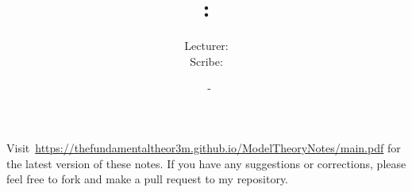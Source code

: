 \documentclass[a4paper, 12pt, openany, oneside]{book}
\title{\vspace{-2em}\COURSENUMBER: \COURSENAME}
\author{Lecturer: \LECTURER \\ Scribe: \SCRIBE}
\date{\UNIVERSITY\ - \TERM}
\begin{document}
\setlength{\abovedisplayskip}{7.5pt}  %
\setlength{\belowdisplayskip}{7.5pt}  %
\setlength{\abovedisplayshortskip}{2pt}
\setlength{\belowdisplayshortskip}{2pt}

\maketitle
\thispagestyle{empty}

\tableofcontents
\thispagestyle{empty}

\newpage

\nocite{*}




% 

\newpage




\printbibliography[prenote=mybibnote]
\thispagestyle{empty}

Visit~\url{https://thefundamentaltheor3m.github.io/ModelTheoryNotes/main.pdf} for the latest version of these notes. If you have any suggestions or corrections, please feel free to fork and make a pull request to my repository.
\end{document}
